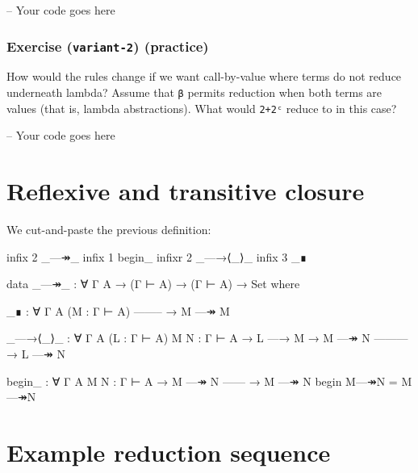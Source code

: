 \begin{fence}
\begin{code}
-- Your code goes here
\end{code}
\end{fence}

\hypertarget{exercise-variant-2-practice}{%
\subsubsection{\texorpdfstring{Exercise (\texttt{variant-2})
(practice)}{Exercise (variant-2) (practice)}}\label{exercise-variant-2-practice}}

How would the rules change if we want call-by-value where terms do not
reduce underneath lambda? Assume that \texttt{β} permits reduction when
both terms are values (that is, lambda abstractions). What would
\texttt{2+2ᶜ} reduce to in this case?

\begin{fence}
\begin{code}
-- Your code goes here
\end{code}
\end{fence}

\hypertarget{reflexive-and-transitive-closure}{%
\section{Reflexive and transitive
closure}\label{reflexive-and-transitive-closure}}

We cut-and-paste the previous definition:

\begin{fence}
\begin{code}
infix  2 _—↠_
infix  1 begin_
infixr 2 _—→⟨_⟩_
infix  3 _∎

data _—↠_ : ∀ {Γ A} → (Γ ⊢ A) → (Γ ⊢ A) → Set where

  _∎ : ∀ {Γ A} (M : Γ ⊢ A)
      --------
    → M —↠ M

  _—→⟨_⟩_ : ∀ {Γ A} (L : Γ ⊢ A) {M N : Γ ⊢ A}
    → L —→ M
    → M —↠ N
      ---------
    → L —↠ N

begin_ : ∀ {Γ} {A} {M N : Γ ⊢ A}
  → M —↠ N
    ------
  → M —↠ N
begin M—↠N = M—↠N
\end{code}
\end{fence}

\hypertarget{example-reduction-sequence}{%
\section{Example reduction sequence}\label{example-reduction-sequence}}

